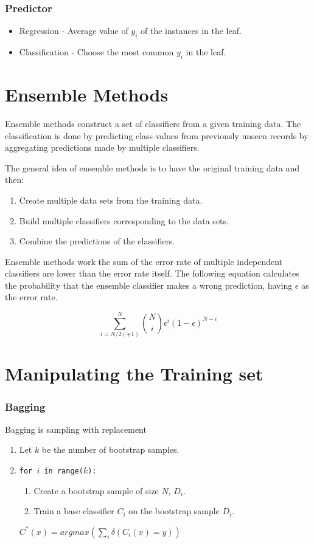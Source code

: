 \subsubsection{Predictor}
\begin{itemize}
    \item Regression - Average value of $y_i$ of the instances in the leaf.
    \item Classification - Choose the most common $y_i$ in the leaf.
\end{itemize}

\section{Ensemble Methods}
Ensemble methods construct a set of classifiers from a given training data.
The classification is done by predicting class values from previously unseen records by aggregating predictions made by multiple classifiers.

\bigskip
The general idea of ensemble methods is to have the original training data and then:
\begin{enumerate}
    \item Create multiple data sets from the training data.
    \item Build multiple classifiers corresponding to the data sets.
    \item Combine the predictions of the classifiers.
\end{enumerate}

Ensemble methods work the sum of the error rate of multiple independent classifiers are lower than the error rate itself.
The following equation calculates the probability that the ensemble classifier makes a wrong prediction, having $\epsilon$ as the error rate.

\begin{equation}
    \sum_{i=N/2(+1)}^N \genfrac(){0pt}{2}{N}{i} \epsilon^i(1-\epsilon)^{N-i}
\end{equation}

\section{Manipulating the Training set}
\subsubsection{Bagging}
Bagging is sampling with replacement

\begin{enumerate}
    \item Let $k$ be the number of bootstrap samples.
    \item \texttt{for $i$ in range($k$):}
    \begin{enumerate}
        \item Create a bootstrap sample of size $N$, $D_i$.
        \item Train a base classifier $C_i$ on the bootstrap sample $D_i$.
    \end{enumerate}
    $C^{*}(x) = argmax\left(\sum_i \delta\left(C_i(x)=y\right)\right)$
\end{enumerate}

